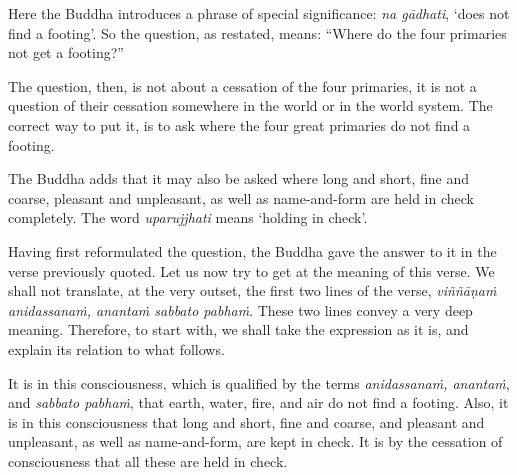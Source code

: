 Here the Buddha introduces a phrase of special significance: \emph{na gādhati}, `does not find a footing'. So the question, as restated, means: ``Where do the four primaries not get a footing?''

The question, then, is not about a cessation of the four primaries, it is not a question of their cessation somewhere in the world or in the world system. The correct way to put it, is to ask where the four great primaries do not find a footing.

The Buddha adds that it may also be asked where long and short, fine and coarse, pleasant and unpleasant, as well as name-and-form are held in check completely. The word \emph{uparujjhati} means `holding in check'.

Having first reformulated the question, the Buddha gave the answer to it in the verse previously quoted. Let us now try to get at the meaning of this verse. We shall not translate, at the very outset, the first two lines of the verse, \emph{viññāṇaṁ anidassanaṁ, anantaṁ sabbato pabhaṁ}. These two lines convey a very deep meaning. Therefore, to start with, we shall take the expression as it is, and explain its relation to what follows.

It is in this consciousness, which is qualified by the terms \emph{anidassanaṁ, anantaṁ}, and \emph{sabbato pabhaṁ}, that earth, water, fire, and air do not find a footing. Also, it is in this consciousness that long and short, fine and coarse, and pleasant and unpleasant, as well as name-and-form, are kept in check. It is by the cessation of consciousness that all these are held in check.
